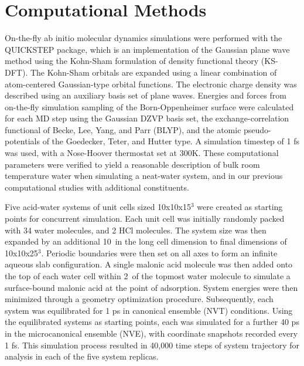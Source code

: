 \section {Computational Methods}

On-the-fly ab initio molecular dynamics simulations were performed with the QUICKSTEP package, which is an implementation of the Gaussian plane wave method using the Kohn-Sham formulation of density functional theory (KS-DFT).\cite{VandeVondele2005} The Kohn-Sham orbitals are expanded using a linear combination of atom-centered Gaussian-type orbital functions. The electronic charge density was described using an auxiliary basis set of plane waves. Energies and forces from on-the-fly simulation sampling of the Born-Oppenheimer surface were calculated for each MD step using the Gaussian DZVP basis set, the exchange-correlation functional of Becke, Lee, Yang, and Parr (BLYP),\cite{Lee1988} and the atomic pseudo-potentials of the Goedecker, Teter, and Hutter type.\cite{Goedecker1996} A simulation timestep of 1 fs was used, with a Nose-Hoover thermostat set at 300K. These computational parameters were verified to yield a reasonable description of bulk room temperature water when simulating a neat-water system, and in our previous computational studies with additional constituents.\cite{Shamay2007}

Five acid-water systems of unit cells sized 10x10x15\angs$^3$ were created as starting points for concurrent simulation.  Each unit cell was initially randomly packed with 34 water molecules, and 2 HCl molecules.  The system size was then expanded by an additional 10\angs~in the long cell dimension to final dimensions of 10x10x25\angs$^3$.  Periodic boundaries were then set on all axes to form an infinite aqueous slab configuration.  A single malonic acid molecule was then added onto the top of each water cell within 2\angs~of the topmost water molecule to simulate a surface-bound malonic acid at the point of adsorption.  System energies were then minimized through a geometry optimization procedure.  Subsequently, each system was equilibrated for 1 ps in canonical ensemble (NVT) conditions.  Using the equilibrated systems as starting points, each was simulated for a further 40 ps in the microcanonical ensemble (NVE), with coordinate snapshots recorded every 1 fs.  This simulation process resulted in 40,000 time steps of system trajectory for analysis in each of the five system replicas.
